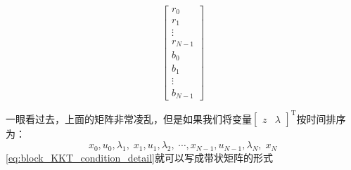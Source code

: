 \documentclass[withoutpreface,bwprint]{NoteBook}
\begin{document}
\begin{equation}
\begin{bmatrix}
r_0\\
r_1 \\
\vdots \\
r_{N-1} \\

b_0 \\ b_1 \\ \vdots \\b_{N-1}
\end{bmatrix}
\end{equation}

一眼看过去，上面的矩阵非常凌乱，但是如果我们将变量$\begin{bmatrix}z & \lambda \end{bmatrix}^\mathrm{T}$按时间排序为：
$$
x_0,u_0, \lambda_1,\; x_1,u_1, \lambda_2,\; \cdots ,x_{N-1},u_{N-1}, \lambda_N, \; x_N
$$
\cref{eq:block_KKT_condition_detail}就可以写成带状矩阵的形式
\end{document}
